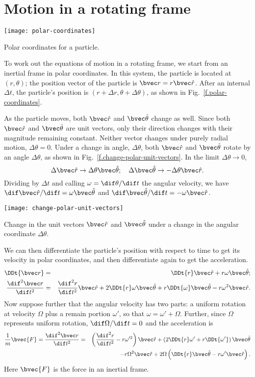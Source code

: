 
\section{Motion in a rotating frame}

\begin{marginfigure}
\texttt{[image: polar-coordinates]}
\caption[Polar coordinates]{Polar coordinates for a particle.
\label{f.polar-coordinates}}
\end{marginfigure}
To work out the equations of motion in a rotating frame, we start from an inertial frame in polar coordinates.  In this system, the particle is located at $(r,\theta)$; the position vector of the particle is $\rv = r\rhat$. After an internal $\Delta t$, the particle's position is $(r+\Delta r,\theta+\Delta\theta)$, as shown in Fig.~\ref{f.polar-coordinates}.  

As the particle moves, both $\rhat$ and $\thetahat$ change as well.  Since both $\rhat$ and $\thetahat$ are unit vectors, only their direction changes with their magnitude remaining constant. Neither vector changes under purely radial motion, $\Delta\theta = 0$.  Under a change in angle, $\Delta\theta$, both $\rhat$ and $\thetahat$ rotate by an angle $\Delta\theta$, as shown in Fig.~\ref{f.change-polar-unit-vectors}. In the limit $\Delta\theta \to 0$, 
\[ \Delta \rhat \to \Delta\theta \thetahat; \quad \Delta\thetahat \to -\Delta\theta\rhat. \]
Dividing by $\Delta t$ and calling $\omega = \dif\theta/\dif t$ the angular velocity, we have
$\dif\rhat/\dif t = \omega\thetahat$ and $\dif\thetahat/\dif t = -\omega\rhat$.

\begin{marginfigure}
\texttt{[image: change-polar-unit-vectors]}
\caption[Change in unit vectors under rotation]{Change in the unit vectors $\rhat$ and $\thetahat$ under a change in the angular coordinate $\Delta\theta$.
\label{f.change-polar-unit-vectors}}
\end{marginfigure}

We can then differentiate the particle's position with respect to time to get its velocity in polar coordinates, and then differentiate again to get the acceleration.
\begin{eqnarray}
\DDt{\rv} &=& \DDt{r}\rhat + r\omega\thetahat; \\
\DDtt{\rv} &=& \DDtt{r}\rhat + 2\DDt{r}\omega\thetahat + r \DDt{\omega}\thetahat - r\omega^{2}\rhat.
\end{eqnarray}
Now suppose further that the angular velocity has two parts: a uniform rotation at velocity $\Omega$ plus a remain portion $\omega'$, so that $\omega = \omega'+\Omega$.  Further, since $\Omega$ represents uniform rotation, $\dif\Omega/\dif t = 0$ and the acceleration is
\begin{eqnarray}
\frac{1}{m}\bvec{F} = \DDtt{\rv} &=& \left(\DDtt{r} - r\omega'^{2}\right)\rhat + \left(2\DDt{r}\omega' + r\DDt{\omega'}\right)\thetahat\nonumber\\
 && -r\Omega^{2}\rhat + 2\Omega\left(\DDt{r}\thetahat - r\omega'\rhat\right).
\end{eqnarray}
Here $\bvec{F}$ is the force in an inertial frame.

